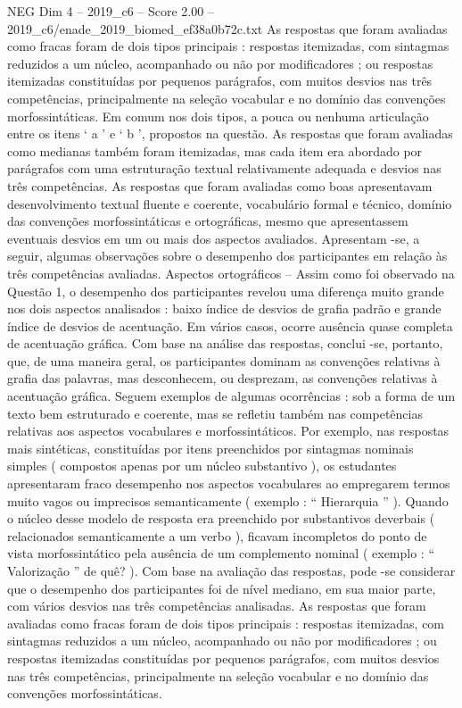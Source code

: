 \begin{textsample}{NEG Dim 4 – 2019\_c6 – Score 2.00 – 2019\_c6/enade\_2019\_biomed\_ef38a0b72c.txt}
As respostas que foram avaliadas como fracas foram de dois tipos principais : respostas itemizadas, com sintagmas reduzidos a um núcleo, acompanhado ou não por modificadores ; ou respostas itemizadas constituídas por pequenos parágrafos, com muitos desvios nas três competências, principalmente na seleção vocabular e no domínio das convenções morfossintáticas.
Em comum nos dois tipos, a pouca ou nenhuma articulação entre os itens ‘ a ’ e ‘ b ’, propostos na questão.
As respostas que foram avaliadas como medianas também foram itemizadas, mas cada item era abordado por parágrafos com uma estruturação textual relativamente adequada e desvios nas três competências.
As respostas que foram avaliadas como boas apresentavam desenvolvimento textual fluente e coerente, vocabulário formal e técnico, domínio das convenções morfossintáticas e ortográficas, mesmo que apresentassem eventuais desvios em um ou mais dos aspectos avaliados.
Apresentam -se, a seguir, algumas observações sobre o desempenho dos participantes em relação às três competências avaliadas.
Aspectos ortográficos – Assim como foi observado na Questão 1, o desempenho dos participantes revelou uma diferença muito grande nos dois aspectos analisados : baixo índice de desvios de grafia padrão e grande índice de desvios de acentuação.
Em vários casos, ocorre ausência quase completa de acentuação gráfica.
Com base na análise das respostas, conclui -se, portanto, que, de uma maneira geral, os participantes dominam as convenções relativas à grafia das palavras, mas desconhecem, ou desprezam, as convenções relativas à acentuação gráfica.
Seguem exemplos de algumas ocorrências : sob a forma de um texto bem estruturado e coerente, mas se refletiu também nas competências relativas aos aspectos vocabulares e morfossintáticos.
Por exemplo, nas respostas mais sintéticas, constituídas por itens preenchidos por sintagmas nominais simples ( compostos apenas por um núcleo substantivo ), os estudantes apresentaram fraco desempenho nos aspectos vocabulares ao empregarem termos muito vagos ou imprecisos semanticamente ( exemplo : “ Hierarquia ” ).
Quando o núcleo desse modelo de resposta era preenchido por substantivos deverbais ( relacionados semanticamente a um verbo ), ficavam incompletos do ponto de vista morfossintático pela ausência de um complemento nominal ( exemplo : “ Valorização ” de quê? ).
Com base na avaliação das respostas, pode -se considerar que o desempenho dos participantes foi de nível mediano, em sua maior parte, com vários desvios nas três competências analisadas.
As respostas que foram avaliadas como fracas foram de dois tipos principais : respostas itemizadas, com sintagmas reduzidos a um núcleo, acompanhado ou não por modificadores ; ou respostas itemizadas constituídas por pequenos parágrafos, com muitos desvios nas três competências, principalmente na seleção vocabular e no domínio das convenções morfossintáticas.

\end{textsample}
